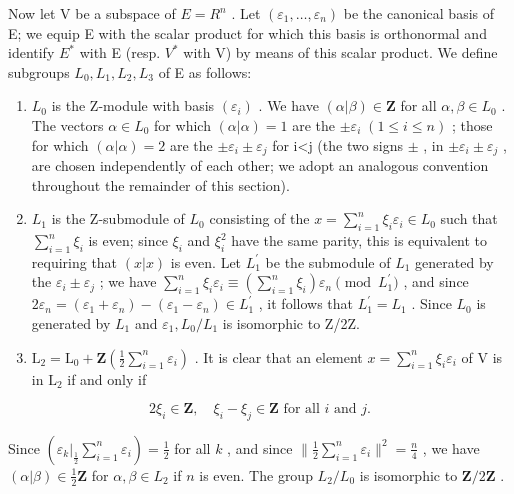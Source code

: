 Now let V be a subspace of \(E = R^{n}\) . Let \((\varepsilon_{1}, \ldots, \varepsilon_{n})\) be the canonical basis of E; we equip E with the scalar product for which this basis is orthonormal and identify \(E^{*}\) with E (resp. \(V^{*}\) with V) by means of this scalar product. We define subgroups \(L_{0}, L_{1}, L_{2}, L_{3}\) of E as follows:

\begin{enumerate}
\def\labelenumi{\arabic{enumi})}
\item
  \(L_{0}\) is the Z-module with basis \((\varepsilon_{i})\) . We have \((\alpha|\beta)\in\mathbf{Z}\) for all \(\alpha,\beta\in L_{0}\) . The vectors \(\alpha\in L_{0}\) for which \((\alpha|\alpha)=1\) are the \(\pm\varepsilon_{i}\;(1\leqslant i\leqslant n)\) ; those for which \((\alpha|\alpha)=2\) are the \(\pm\varepsilon_{i}\pm\varepsilon_{j}\) for i\textless j (the two signs \(\pm\) , in \(\pm\varepsilon_{i}\pm\varepsilon_{j}\) , are chosen independently of each other; we adopt an analogous convention throughout the remainder of this section).
\item
  \(L_{1}\) is the Z-submodule of \(L_{0}\) consisting of the \(x = \sum_{i=1}^{n} \xi_{i} \varepsilon_{i} \in L_{0}\) such that \(\sum_{i=1}^{n} \xi_{i}\) is even; since \(\xi_{i}\) and \(\xi_{i}^{2}\) have the same parity, this is equivalent to requiring that \((x|x)\) is even. Let \(L_{1}^{\prime}\) be the submodule of \(L_{1}\) generated by the \(\varepsilon_{i} \pm \varepsilon_{j}\) ; we have \(\sum_{i=1}^{n} \xi_{i} \varepsilon_{i} \equiv (\sum_{i=1}^{n} \xi_{i}) \varepsilon_{n} \pmod{L_{1}^{\prime}}\) , and since \(2\varepsilon_{n} = (\varepsilon_{1} + \varepsilon_{n}) - (\varepsilon_{1} - \varepsilon_{n}) \in L_{1}^{\prime}\) , it follows that \(L_{1}^{\prime} = L_{1}\) . Since \(L_{0}\) is generated by \(L_{1}\) and \(\varepsilon_{1}, L_{0}/L_{1}\) is isomorphic to Z/2Z.
\item
  \(\mathrm{L}_2 = \mathrm{L}_0 + \mathbf{Z}\left(\frac{1}{2} \sum_{i=1}^{n} \varepsilon_i\right)\) . It is clear that an element \(x = \sum_{i=1}^{n} \xi_i \varepsilon_i\) of \(\mathrm{V}\) is in \(\mathrm{L}_2\) if and only if
\end{enumerate}

\[
2 \xi_ {i} \in \mathbf {Z}, \quad \xi_ {i} - \xi_ {j} \in \mathbf {Z} \text {   for   all   } i \text {   and   } j.\tag{6}
\]

Since \((\varepsilon_k|_{\frac{1}{2}}\sum_{i=1}^{n}\varepsilon_i) = \frac{1}{2}\) for all \(k\) , and since \(\| \frac{1}{2}\sum_{i=1}^{n}\varepsilon_i\|^2 = \frac{n}{4}\) , we have \((\alpha|\beta) \in \frac{1}{2}\mathbf{Z}\) for \(\alpha, \beta \in L_2\) if \(n\) is even. The group \(L_2 / L_0\) is isomorphic to \(\mathbf{Z}/2\mathbf{Z}\) .

